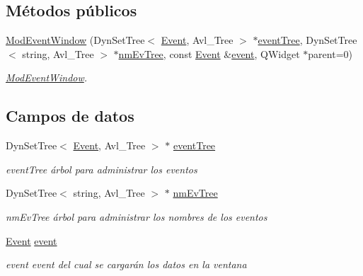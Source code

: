 \subsection*{Métodos públicos}
\begin{DoxyCompactItemize}
\item 
\hyperlink{class_mod_event_window_a875c429ec86128817767b22620118835}{Mod\+Event\+Window} (Dyn\+Set\+Tree$<$ \hyperlink{class_event}{Event}, Avl\+\_\+\+Tree $>$ $\ast$\hyperlink{class_mod_event_window_afe17e39631e29b25a5442bfa41575dce}{event\+Tree}, Dyn\+Set\+Tree$<$ string, Avl\+\_\+\+Tree $>$ $\ast$\hyperlink{class_mod_event_window_aad74911e45084165e63946832e502f9c}{nm\+Ev\+Tree}, const \hyperlink{class_event}{Event} \&\hyperlink{class_mod_event_window_aa6931186e1f39dafc51befc85bed2470}{event}, Q\+Widget $\ast$parent=0)
\begin{DoxyCompactList}\small\item\em \hyperlink{class_mod_event_window}{Mod\+Event\+Window}. \end{DoxyCompactList}\end{DoxyCompactItemize}
\subsection*{Campos de datos}
\begin{DoxyCompactItemize}
\item 
Dyn\+Set\+Tree$<$ \hyperlink{class_event}{Event}, Avl\+\_\+\+Tree $>$ $\ast$ \hyperlink{class_mod_event_window_afe17e39631e29b25a5442bfa41575dce}{event\+Tree}\hypertarget{class_mod_event_window_afe17e39631e29b25a5442bfa41575dce}{}\label{class_mod_event_window_afe17e39631e29b25a5442bfa41575dce}

\begin{DoxyCompactList}\small\item\em event\+Tree árbol para administrar los eventos \end{DoxyCompactList}\item 
Dyn\+Set\+Tree$<$ string, Avl\+\_\+\+Tree $>$ $\ast$ \hyperlink{class_mod_event_window_aad74911e45084165e63946832e502f9c}{nm\+Ev\+Tree}\hypertarget{class_mod_event_window_aad74911e45084165e63946832e502f9c}{}\label{class_mod_event_window_aad74911e45084165e63946832e502f9c}

\begin{DoxyCompactList}\small\item\em nm\+Ev\+Tree árbol para administrar los nombres de los eventos \end{DoxyCompactList}\item 
\hyperlink{class_event}{Event} \hyperlink{class_mod_event_window_aa6931186e1f39dafc51befc85bed2470}{event}\hypertarget{class_mod_event_window_aa6931186e1f39dafc51befc85bed2470}{}\label{class_mod_event_window_aa6931186e1f39dafc51befc85bed2470}

\begin{DoxyCompactList}\small\item\em event event del cual se cargarán los datos en la ventana \end{DoxyCompactList}\end{DoxyCompactItemize}


